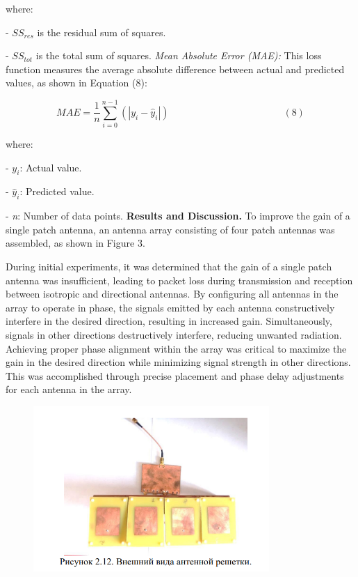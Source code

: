where:


- \({SS}_{res}\) is the residual sum of squares.

- \({SS}_{tot}\) is the total sum of squares.
\emph{Mean Absolute Error (MAE):} This loss function measures the
average absolute difference between actual and predicted values, as
shown in Equation (8):

\[MAE = \frac{1}{n}\sum_{i = 0}^{n - 1}{(|y_{i} - {\widehat{y}}_{i}|)\ }\ \ \ \ \ \ \ \ \ \ \ \ \ \ \ \ \ \ \ \ \ \ \ \ \ \ \ \ \ \ \ \ \ \ \ \ \ \ \ \ \ \ \ \ \ \ \ \ \ \ \ \ (8)\]

where:


- \(y_{i}\): Actual value.

- \({\widehat{y}}_{i}\)\hspace{0pt}: Predicted value.

- \emph{n}: Number of data points.
{\bfseries Results and Discussion.} To improve the gain of a single patch
antenna, an antenna array consisting of four patch antennas was
assembled, as shown in Figure 3.

During initial experiments, it was determined that the gain of a single
patch antenna was insufficient, leading to packet loss during
transmission and reception between isotropic and directional antennas.
By configuring all antennas in the array to operate in phase, the
signals emitted by each antenna constructively interfere in the desired
direction, resulting in increased gain. Simultaneously, signals in other
directions destructively interfere, reducing unwanted radiation.
Achieving proper phase alignment within the array was critical to
maximize the gain in the desired direction while minimizing signal
strength in other directions. This was accomplished through precise
placement and phase delay adjustments for each antenna in the array.


\begin{figure}[H]
	\centering
	\includegraphics[width=0.8\textwidth]{media/ict/image43}
	\caption*{}
\end{figure}


